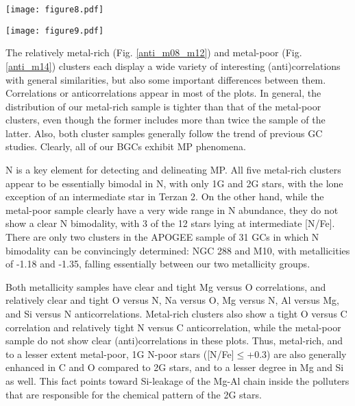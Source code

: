 \documentclass[onecolumn]{aa}
\begin{document}
\begin{figure*}
\centering
   \texttt{[image: figure8.pdf]}
      \caption{Light-element (anti)correlations for our higher metallicity clusters: Terzan 2 (red circles),  
      Djorg 2 (magenta), HP1 (cyan), NGC 6540 (yellow), and NGC 6642 (green). Comparison objects (empty circles) from \citet{Masseron2019} and \citet{Meszaros2020} were selected in the metallicity range [Fe/H]$>-1.3$. Typical error bars are about 0.1 dex per element.}
    \label{anti_m08_m12}
\end{figure*}

\begin{figure*}
\centering

   \texttt{[image: figure9.pdf]}
      \caption{Light-element (anti)correlations for our lower metallicity clusters
       Terzan 9 (blue circles) and Terzan 4 (orange circles). Comparison objects (empty circles) from \citet{Masseron2019} and \cite{Meszaros2020} were selected in the metallicity range -1.6$\leq [Fe/H] \leq $ -1.2. Typical error bars are about 0.1 dex per element.}
    \label{anti_m14}
\end{figure*}

The relatively metal-rich (Fig. \ref{anti_m08_m12}) and metal-poor (Fig. \ref{anti_m14}) clusters each display a wide variety of interesting (anti)correlations with general similarities, but also some important differences between them. Correlations or anticorrelations appear in most of the plots. In general, the distribution of our metal-rich sample is tighter than that of the metal-poor clusters, even though the former includes more than twice the sample of the latter. Also, both cluster samples generally follow the trend of previous GC studies. Clearly, all of our BGCs exhibit MP phenomena.

N is a key element for detecting and delineating MP. All five metal-rich clusters appear to be essentially bimodal in N, with only 1G and 2G stars, with the lone exception of an intermediate star in Terzan 2. On the other hand,  while the metal-poor sample clearly have a very wide range in N abundance, they do not show a clear N bimodality, with 3 of the 12 stars lying at intermediate [N/Fe]. There are only two clusters in the \citet{Meszaros2020} APOGEE sample of 31 GCs in which N bimodality can be convincingly determined: NGC 288 and M10, with metallicities of -1.18 and -1.35, falling essentially between our two metallicity groups.

Both metallicity samples have clear and tight Mg versus O correlations, and relatively clear and tight O versus N, Na versus O, Mg versus N, Al versus Mg, and Si versus N anticorrelations. Metal-rich clusters also show a tight O versus C correlation and relatively tight N versus C anticorrelation, while the metal-poor sample do not show clear (anti)correlations in these plots. Thus, metal-rich, and to a lesser extent metal-poor, 1G N-poor stars ([N/Fe]$\leq $+0.3) are also generally enhanced in C and O compared to 2G stars, and to a lesser degree in Mg and Si as well. This  fact points toward  Si-leakage of the Mg-Al chain inside the polluters that are responsible for the chemical pattern of the 2G stars. 
\end{document}
